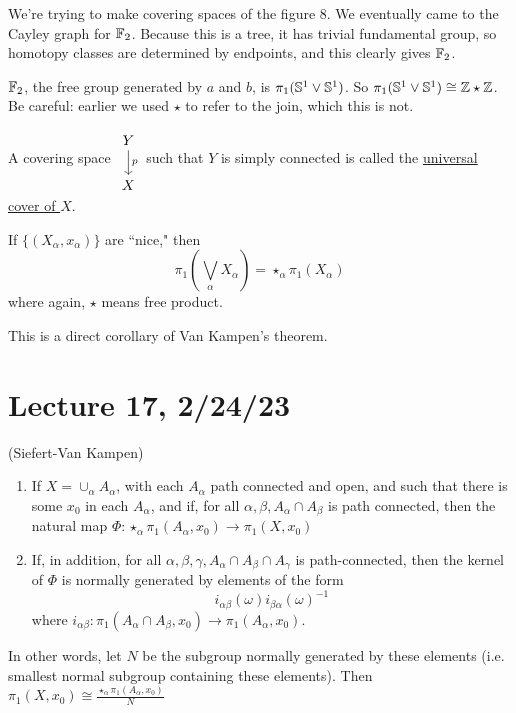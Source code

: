 \documentclass[x11names,reqno,14pt]{extarticle}
\begin{document}
We're trying to make covering spaces of the figure 8. We eventually came to the Cayley graph for $\mathbb{F}_2$. Because this is a tree, it has trivial fundamental group, so homotopy classes are determined by endpoints, and this clearly gives $\mathbb{F}_2$.

$\mathbb{F}_2$, the free group generated by $a$ and $b$, is $\pi_1(\mathbb{S}^1\vee\mathbb{S}^1)$. So $\pi_1(\mathbb{S}^1\vee\mathbb{S}^1)\cong\mathbb{Z}\star\mathbb{Z}$. Be careful: earlier we used $\star$ to refer to the join, which this is not.


A covering space $\begin{tikzcd} Y \ar[d, "p"] \\ X \end{tikzcd}$ such that $Y$ is simply connected is called the \underline{universal cover of $X$}. 


\thm 

If $\{(X_\alpha, x_\alpha)\}$ are ``nice," then 
\[
\pi_1(\bigvee_\alpha X_\alpha) = \star_\alpha\pi_1(X_\alpha)
\]
where again, $\star$ means free product. 

\proof

This is a direct corollary of Van Kampen's theorem. 

\section*{Lecture 17, 2/24/23} 

\thm (Siefert-Van Kampen)

\begin{enumerate}

\item If $X = \cup_{\alpha}A_\alpha$, with each $A_\alpha$ path connected and open, and such that there is some $x_0$ in each $A_\alpha$, and if, for all $\alpha, \beta, A_\alpha \cap A_\beta$ is path connected, then the natural map $\Phi:\star_\alpha\pi_1(A_\alpha, x_0)\to\pi_1(X, x_0)$

\item If, in addition, for all $\alpha,\beta,\gamma, A_\alpha \cap A_\beta \cap A_\gamma$ is path-connected, then the kernel of $\Phi$ is normally generated by elements of the form 
\[
i_{\alpha\beta}(\omega)i_{\beta\alpha}(\omega)^{-1}
\]
where $i_{\alpha\beta}:\pi_1(A_\alpha \cap A_\beta, x_0) \to \pi_1(A_\alpha, x_0)$.

\end{enumerate}

In other words, let $N$ be the subgroup normally generated by these elements (i.e. smallest normal subgroup containing these elements). Then $\pi_1(X, x_0) \cong \frac{\star_{\alpha}\pi_1(A_\alpha, x_0)}{N}$
\end{document}
